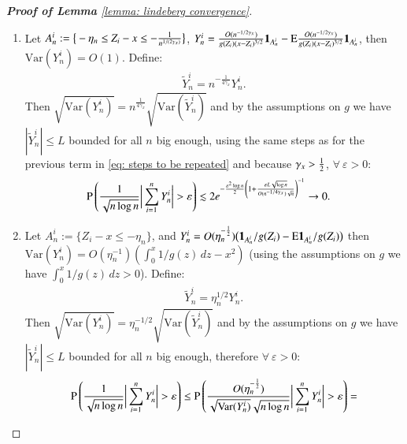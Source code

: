 \begin{proof}[\hypertarget{proof of lemma 7}{\textbf{Proof of Lemma}} \ref{lemma: lindeberg convergence}]
\begin{enumerate}
    \begin{align*}
        &\pb \left( \frac{1}{ \sqrt{n \log{n}}} \bigg| \sum_{i=1}^{n} Y^i_n \bigg| > \varepsilon \right) \lesssim 2 e^{ - \frac{\varepsilon^2 \log{n} }{2} \left( 1 + \frac{\varepsilon  L \sqrt{\log{n}}}{ O(n^{-1/4\gamma_{\scaleto{x}{2.2pt}}}) \sqrt{n}} \right)^{-1} } \rightarrow 0.
    \end{align*}
    \item Let $A^i_n := \big\{ -\eta_n \leq Z_i-x \leq -\frac{1}{n^{1/(2\gamma_{\scaleto{x}{2.2pt}})}} \big\}$, $Y^i_n = \frac{O(n^{-1/2\gamma_{\scaleto{x}{2.2pt}}})}{g(Z_i)(x-Z_i)^{3/2}} \ind_{A^i_n} - \ex \frac{O(n^{-1/2\gamma_{\scaleto{x}{2.2pt}}})}{g(Z_i)(x-Z_i)^{3/2}} \ind_{A^i_n}$, then $\mathrm{Var}(Y^i_n) = O(1)$. Define:
    \begin{align*}
         \widetilde{Y}^i_n = n^{-\frac{1}{4\gamma_x}} Y^i_n. 
     \end{align*}
    Then $\sqrt{\mathrm{Var}(Y^i_n)} = n^{\frac{1}{4\gamma_x}} \sqrt{\mathrm{Var}(\widetilde{Y}^i_n)}$ and by the assumptions on $g$ we have $|\widetilde{Y}^{i}_n| \leq L$ bounded for all $n$ big enough, using the same steps as for the previous term in \eqref{eq: steps to be repeated} and because $\gamma_{\scaleto{x}{3.2pt}} > \frac{1}{2}$, $\forall \: \varepsilon >0$:
     \begin{align*}
        &\pb \left( \frac{1}{ \sqrt{n \log{n}}} \bigg| \sum_{i=1}^{n} Y^i_n \bigg| > \varepsilon \right) \lesssim 2 e^{ - \frac{\varepsilon^2 \log{n} }{2} \left( 1 + \frac{\varepsilon  L \sqrt{\log{n}}}{ O(n^{-1/4\gamma_{\scaleto{x}{2.2pt}}}) \sqrt{n}} \right)^{-1} } \rightarrow 0.
    \end{align*}
    \item Let $A^i_n := \big\{Z_i-x \leq -\eta_n \big\}$, and $Y^i_n = O(\eta_n^{-\frac{1}{2}})\big(\mathbf{1}_{A^i_n}/g(Z_i) - \mathrm{E} \mathbf{1}_{A^i_n}/g(Z_i)\big)$ then $\mathrm{Var}(Y^i_n) = O(\eta_n^{-1}) \left(\int_{0}^x 1/g(z) \, dz - x^2 \right)$ (using the assumptions on $g$ we have $\int_{0}^x 1/g(z) \, dz >0$). Define:
    \begin{align*}
         \widetilde{Y}^i_n = \eta_n^{1/2} Y^i_n. 
     \end{align*}
    Then $\sqrt{\mathrm{Var}(Y^i_n)} = \eta_n^{-1/2} \sqrt{\mathrm{Var}(\widetilde{Y}^i_n)}$ and by the assumptions on $g$ we have $|\widetilde{Y}^{i}_n| \leq L$ bounded for all $n$ big enough, therefore $\forall \: \varepsilon >0$:
    \begin{align*}
        &\pb \left( \frac{1}{ \sqrt{n \log{n}}} \bigg| \sum_{i=1}^{n} Y^i_n \bigg| > \varepsilon \right) \leq \pb \left( \frac{ O(\eta_n^{-\frac{1}{2}})}{\sqrt{\mathrm{Var} (Y^i_n)} \sqrt{n \log{n}}} \bigg| \sum_{i=1}^{n} Y^i_n \bigg|  > \varepsilon \right) =\\ 

\end{align*}
\end{enumerate}
\end{proof}
